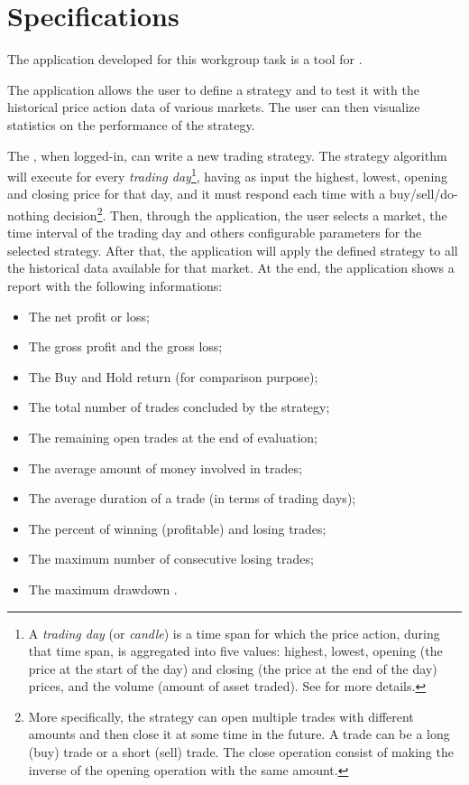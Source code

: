 \chapter{Specifications}\label{ch:specs}

The application developed for this workgroup task is a tool for
.

The application allows the user to define a strategy and to test it with the
historical price action data of various markets. The user can then visualize
statistics on the performance of the strategy.

The , when logged-in, can write a new trading strategy. The
strategy algorithm will execute for every \emph{trading day}\footnote{A
\emph{trading day} (or \emph{candle}) is a time span for which the price action,
during that time span, is aggregated into five values: highest, lowest, opening
(the price at the start of the day) and closing (the price at the end of the
day) prices, and the volume (amount of asset traded). See
 for more details.}, having as input the highest,
lowest, opening and closing price for that day, and it must respond each time
with a buy/sell/do-nothing decision\footnote{More specifically, the strategy can
open multiple trades with different amounts and then close it at some time in
the future. A trade can be a long (buy) trade or a short (sell) trade. The
close operation consist of making the inverse of the opening operation with the
same amount.}. Then, through the application, the user selects a market, the
time interval of the trading day and others configurable parameters for the
selected strategy. After that, the application will apply the defined strategy
to all the historical data available for that market. At the end, the
application shows a report with the following informations:
\begin{itemize}
	\item The net profit or loss;
	\item The gross profit  and the gross loss;
	\item The Buy and Hold return (for comparison purpose);
	\item The total number of trades concluded by the strategy;
	\item The remaining open trades at the end of evaluation;
	\item The average amount of money involved in trades;
	\item The average duration of a trade (in terms of trading days);
	\item The percent of winning (profitable) and losing trades;
	\item The maximum number of consecutive losing trades;
	\item The maximum drawdown .
\end{itemize}


